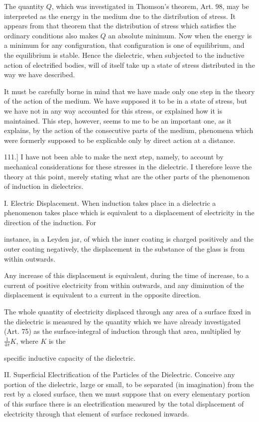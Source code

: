 \documentclass[11pt,a4paper]{article}
\begin{document}
The quantity $Q$, which was investigated in Thomson's theorem, Art. 98, may be interpreted as the energy in the medium due to the distribution of stress. It appears from that theorem that the distribution of stress which satisfies the ordinary conditions also makes $Q$ an absolute minimum. Now when the energy is a minimum for any configuration, that configuration is one of equilibrium, and the equilibrium is stable. Hence the dielectric, when subjected to the inductive action of electrified bodies, will of itself take up a state of stress distributed in the way we have described.

It must be carefully borne in mind that we have made only one step in the theory of the action of the medium. We have supposed it to be in a state of stress, but we have not in any way accounted for this stress, or explained how it is maintained. This step, however, seems to me to be an important one, as it explains, by the action of the consecutive parts of the medium, phenomena which were formerly supposed to be explicable only by direct action at a distance.

111.] I have not been able to make the next step, namely, to account by mechanical considerations for these stresses in the dielectric. I therefore leave the theory at this point, merely stating what are the other parts of the phenomenon of induction in dielectrics.

\medskip
\noindent I. Electric Displacement. When induction takes place in a dielectric a phenomenon takes place which is equivalent to a displacement of electricity in the direction of the induction. For

instance, in a Leyden jar, of which the inner coating is charged positively and the outer coating negatively, the displacement in the substance of the glass is from within outwards.

Any increase of this displacement is equivalent, during the time of increase, to a current of positive electricity from within outwards, and any diminution of the displacement is equivalent to a current in the opposite direction.

The whole quantity of electricity displaced through any area of a surface fixed in the dielectric is measured by the quantity which we have already investigated (Art. 75) as the surface-integral of induction through that area, multiplied by $\frac{1}{4\pi}K$, where $K$ is the

specific inductive capacity of the dielectric.

\medskip
\noindent II. Superficial Electrification of the Particles of the Dielectric. Conceive any portion of the dielectric, large or small, to be separated (in imagination) from the rest by a closed surface, then we must suppose that on every elementary portion of this surface there is an electrification measured by the total displacement of electricity through that element of surface reckoned inwards.
\end{document}
